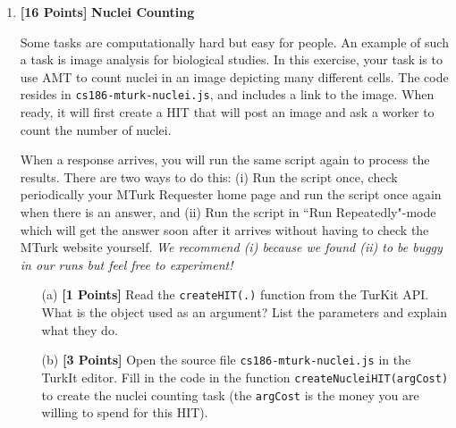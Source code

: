 \documentclass[11pt]{article}
\newcommand{\points}[1]{\textbf{[#1 Points]}}
\begin{document}
\begin{enumerate}
\begin{enumerate}
\item \points{6} As a ``Requester" you can monitor your HITs. Here is the link:
At the ``Manage" tab (\url{https://requester.mturk.com/manage}), click on the 
``Manage HITs individually." 
There you can see the open HITs, review submissions from workers and 
agree on payments. In this task, ask 5 workers to pick a random number. You will need to run in ``Real" mode
and attach a snapshot )e.g., see the one below.) 
Also don't forget to review the submissions and pay your workers.
Write down the answers and comment on how ``random" the choices were. Also write down how long it took
to get all 5 answers and comment. A suitable payment for
a simple HIT like this one is probably around 2 cents.
%
\begin{figure}[h]
\begin{center}
\end{center}
\caption{Posted tasks in the ``Manage" console}
\end{figure}

\end{enumerate}


\newpage
\item \points{16} {\bf Nuclei Counting}

Some tasks are computationally hard but easy for people. An example of
such a task is image analysis for biological studies.
%
In this exercise, your task is to use AMT to count nuclei in an image
depicting many different cells. The code resides in
\texttt{cs186-mturk-nuclei.js}, and includes a link to the image. When
ready, it will first create a HIT that will post an image and ask a
worker to count the number of nuclei.

When a response arrives, you will 
run the same script again to process the results. There are two ways to do this: (i) Run the script once, check periodically your MTurk Requester home page and run the script once again when there is an answer, and (ii) Run the script in ``Run Repeatedly"-mode which will get the answer soon after it arrives without 
having to check the MTurk website yourself. 
{\em We recommend (i) because we found (ii) to be buggy in our runs but feel free to experiment!}
%
\begin{enumerate}
\item[(a)] \points{1} Read the \texttt{createHIT(.)} function from the TurKit API. What is the object 
used as an argument? List the parameters and explain what they do. 
%
\item[(b)] \points{3}
Open the source file \texttt{cs186-mturk-nuclei.js} 
in the TurkIt editor.
Fill in the code in the function \texttt{createNucleiHIT(argCost)}
to create the nuclei counting task (the \texttt{argCost}
is the money you are willing to spend for this HIT).


\end{enumerate}
\end{enumerate}
\end{document}
